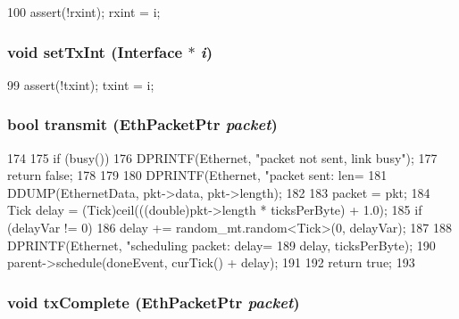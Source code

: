 \begin{DoxyCode}
100 { assert(!rxint); rxint = i; }
\end{DoxyCode}
\hypertarget{classEtherLink_1_1Link_a47597f43046767553e7abc1b22851548}{
\subsubsection[{setTxInt}]{\setlength{\rightskip}{0pt plus 5cm}void setTxInt ({\bf Interface} $\ast$ {\em i})}}
\label{classEtherLink_1_1Link_a47597f43046767553e7abc1b22851548}



\begin{DoxyCode}
99 { assert(!txint); txint = i; }
\end{DoxyCode}
\hypertarget{classEtherLink_1_1Link_a740c6672cf526da9b2acc1f438ac11c7}{
\subsubsection[{transmit}]{\setlength{\rightskip}{0pt plus 5cm}bool transmit ({\bf EthPacketPtr} {\em packet})}}
\label{classEtherLink_1_1Link_a740c6672cf526da9b2acc1f438ac11c7}



\begin{DoxyCode}
174 {
175     if (busy()) {
176         DPRINTF(Ethernet, "packet not sent, link busy\n");
177         return false;
178     }
179 
180     DPRINTF(Ethernet, "packet sent: len=%
181     DDUMP(EthernetData, pkt->data, pkt->length);
182 
183     packet = pkt;
184     Tick delay = (Tick)ceil(((double)pkt->length * ticksPerByte) + 1.0);
185     if (delayVar != 0)
186         delay += random_mt.random<Tick>(0, delayVar);
187 
188     DPRINTF(Ethernet, "scheduling packet: delay=%
189             delay, ticksPerByte);
190     parent->schedule(doneEvent, curTick() + delay);
191 
192     return true;
193 }
\end{DoxyCode}
\hypertarget{classEtherLink_1_1Link_adbafd80b139f69d1879a399e64f4dda2}{
\subsubsection[{txComplete}]{\setlength{\rightskip}{0pt plus 5cm}void txComplete ({\bf EthPacketPtr} {\em packet})}}
\label{classEtherLink_1_1Link_adbafd80b139f69d1879a399e64f4dda2}



